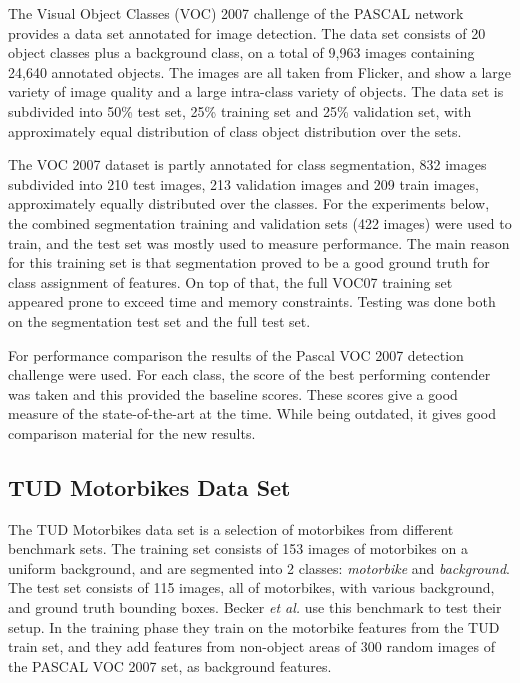 \label{sec:voc_data_set}
The Visual Object Classes (VOC) 2007 challenge of the PASCAL network \cite{pascal-voc-2007} provides a data set annotated for image detection. The data set consists of 20 object classes plus a background class, on a total of 9,963 images containing 24,640 annotated objects. The images are all taken from Flicker, and show a large variety of image quality and a large intra-class variety of objects. The data set is subdivided into 50\% test set, 25\% training set and 25\% validation set, with approximately equal distribution of class object distribution over the sets.

The VOC 2007 dataset is partly annotated for class segmentation, 832 images subdivided into 210 test images, 213 validation images and 209 train images, approximately equally distributed over the classes. For the experiments below, the combined segmentation training and validation sets (422 images) were used to train, and the test set was mostly used to measure performance. The main reason for this training set is that segmentation proved to be a good ground truth for class assignment of features. On top of that, the full VOC07 training set appeared prone to exceed time and memory constraints. Testing was done both on the segmentation test set and the full test set.

For performance comparison the results of the Pascal VOC 2007 detection challenge were used. For each class, the score of the best performing contender was taken and this provided the baseline scores. These scores give a good measure of the state-of-the-art at the time. While being outdated, it gives good comparison material for the new results.


\subsection{TUD Motorbikes Data Set} %
\label{sec:tudmotorbikes_data_set}
The TUD Motorbikes data set is a selection of motorbikes from different benchmark sets. \cite{fritz2005integrating} The training set consists of 153 images of motorbikes on a uniform background, and are segmented into 2 classes: \emph{motorbike} and \emph{background}. The test set consists of 115 images, all of motorbikes, with various background, and ground truth bounding boxes. Becker \emph{et al.} \cite{becker2012codebook} use this benchmark to test their setup. In the training phase they train on the motorbike features from the TUD train set, and they add features from non-object areas of 300 random images of the PASCAL VOC 2007 set, as background features.

